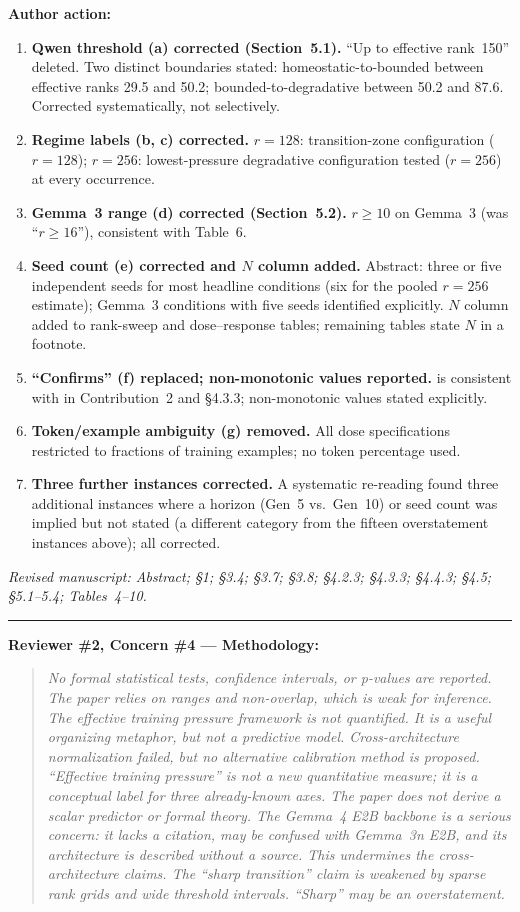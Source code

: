 \documentclass[11pt,a4paper]{article}
\newcommand{\newtext}[1]{#1}
\newcommand{\rconcern}[3]{%
  \bigskip\noindent\rule{\linewidth}{0.4pt}\par\medskip
  \noindent\textbf{\textcolor{rccolor}{#1 --- #2:}}\par
  \smallskip
  \begin{quote}\itshape\textcolor{rccolor}{#3}\end{quote}%
}
\newcommand{\arhead}[1]{\medskip\noindent\textbf{#1}\par\smallskip}
\newcommand{\newtext}[1]{\textcolor{chgcolor}{``#1''}}
\newcommand{\msloc}[1]{%
  \smallskip\noindent\textit{Revised manuscript: #1}\par%
}
\begin{document}
\arhead{Author action:}
\begin{enumerate}[leftmargin=1.4em,itemsep=0.3em]
\item \textbf{Qwen threshold (a) corrected (Section~5.1).}
      ``Up to effective rank~150'' deleted. Two distinct boundaries stated: homeostatic-to-bounded between effective ranks 29.5 and 50.2; bounded-to-degradative between 50.2 and 87.6. Corrected systematically,
      not selectively.
\item \textbf{Regime labels (b, c) corrected.}
      $r=128$: \newtext{transition-zone configuration ($r=128$)};
      $r=256$: \newtext{lowest-pressure degradative configuration tested
      ($r=256$)} at every occurrence.
\item \textbf{Gemma~3 range (d) corrected (Section~5.2).}
      \newtext{$r \geq 10$ on Gemma~3} (was ``$r \geq 16$''),
      consistent with Table~6.
\item \textbf{Seed count (e) corrected and $N$ column added.}
      Abstract: \newtext{three or five independent seeds for most
      headline conditions (six for the pooled $r{=}256$ estimate);
      Gemma~3 conditions with five seeds identified explicitly.}
      $N$ column added to rank-sweep and dose--response tables;
      remaining tables state $N$ in a footnote.
\item \textbf{``Confirms'' (f) replaced; non-monotonic values reported.}
      \newtext{is consistent with} in Contribution~2 and \S4.3.3;
      non-monotonic values stated explicitly.
\item \textbf{Token/example ambiguity (g) removed.}
      All dose specifications restricted to fractions of training examples;
      no token percentage used.
\item \textbf{Three further instances corrected.}
      A systematic re-reading found three additional instances where a
      horizon (Gen~5 vs.\ Gen~10) or seed count was implied but not
      stated (a different category from the fifteen overstatement
      instances above); all corrected.
\end{enumerate}

\msloc{Abstract; \S1; \S3.4; \S3.7; \S3.8;
\S4.2.3; \S4.3.3; \S4.4.3; \S4.5;
\S5.1--5.4; Tables~4--10.}

\rconcern{Reviewer \#2, Concern \#4}{Methodology}{No formal statistical
tests, confidence intervals, or p-values are reported. The paper relies
on ranges and non-overlap, which is weak for inference. The effective
training pressure framework is not quantified. It is a useful
organizing metaphor, but not a predictive model.
Cross-architecture normalization failed, but no alternative calibration
method is proposed.
``Effective training pressure'' is not a new quantitative measure; it is
a conceptual label for three already-known axes. The paper does not
derive a scalar predictor or formal theory. The Gemma~4 E2B
backbone is a serious concern: it lacks a citation, may be confused with
Gemma~3n E2B, and its architecture is described without a source. This
undermines the cross-architecture claims. The
``sharp transition'' claim is weakened by sparse rank grids and wide
threshold intervals. ``Sharp'' may be an overstatement.}
\end{document}
